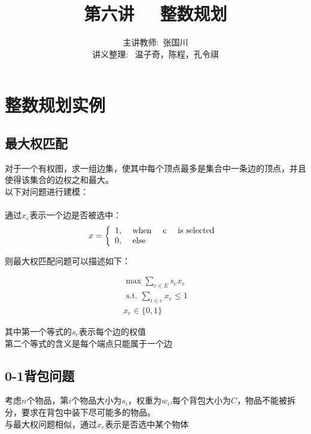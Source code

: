 \documentclass[11pt]{ctexart}
\title{\Huge 第六讲  \ \ 整数规划}
\author{主讲教师:\  张国川
\\ 讲义整理: \ 温子奇，陈程，孔令祺}
\begin{document}
\maketitle



\section{整数规划实例}

\subsection{最大权匹配}
对于一个有权图，求一组边集，使其中每个顶点最多是集合中一条边的顶点，并且使得该集合的边权之和最大。\\

以下对问题进行建模：\\
\\
通过$x_e$表示一个边是否被选中：\\

$$
x=\left\{\begin{array}{ll}
1, & \text { when \quad } e \text { \quad is selected } \\
0, & \text { else } 
\end{array}\right.
$$

则最大权匹配问题可以描述如下：

$$
\begin{array}{c}
\max \sum_{e \in E} s_{e}x_{e} \\
\text { s.t. } \sum_{i \in e} x_{e} \leq 1 \\
x_{e} \in\{0,1\}
\end{array}
$$

其中第一个等式的$s_{e}$表示每个边的权值 \\

第二个等式的含义是每个端点只能属于一个边 \\


\subsection{0-1背包问题}

考虑$n$个物品，第$i$个物品大小为$s_i$，权重为$w_i$,每个背包大小为$C$，物品不能被拆分，要求在背包中装下尽可能多的物品。\\

与最大权问题相似，通过$x_e$表示是否选中某个物体\\
\end{document}
